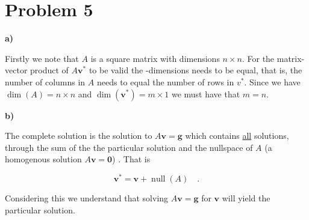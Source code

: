 \documentclass[final, 3p, times, 11.5pt]{article}
\begin{document}
\section*{Problem 5}

\textbf{a)} 

Firstly we note that $A$ is a square matrix with dimensions $n\times n$. For the matrix-vector product of $A\mathbf{v}^*$ to be valid the -dimensions needs to be equal, that is, the number of columns in $A$ needs to equal the number of rows in $v^*$. Since we have $\operatorname{dim}(A)=n\times n$ and $\operatorname{dim}(\mathbf{v}^*)=m\times 1$ we must have that $m=n$.

\textbf{b)} 

The complete solution is the solution to $A\mathbf{v} = \mathbf{g}$ which contains \underline{all} solutions, through the sum of the the particular solution and the nullspace of $A$ (a homogenous solution $A\mathbf{v} = \mathbf{0}$) \cite{Linear_Algebra_and_its_Applications}. That is

$$\mathbf{v}^* = \mathbf{v} + \operatorname{null}(A) \quad .$$

Considering this we understand that solving $A\mathbf{v} = \mathbf{g}$ for $\mathbf{v}$ will yield the particular solution. 
\end{document}
